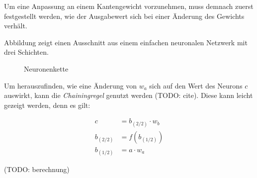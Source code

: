 Um eine Anpassung an einem Kantengewicht vorzunehmen, muss demnach zuerst
festgestellt werden, wie der Ausgabewert sich bei einer Änderung des Gewichts
verhält.

Abbildung zeigt einen Ausschnitt aus einem einfachen neuronalen Netzwerk
mit drei Schichten.

\begin{figure}[H]
    \centering
    \caption{Neuronenkette}
\end{figure}

Um herauszufinden, wie eine Änderung von $w_a$ sich auf den Wert des Neurons $c$
auswirkt, kann die \emph{Chainingregel} genutzt werden (TODO: cite).
Diese kann leicht gezeigt werden, denn es gilt:

\begin{align*}
    c         & = b_{(2/2)}\cdot w_b \\
    b_{(2/2)} & = f(b_{(1/2)})       \\
    b_{(1/2)} & = a\cdot w_a
\end{align*}

(TODO: berechnung)